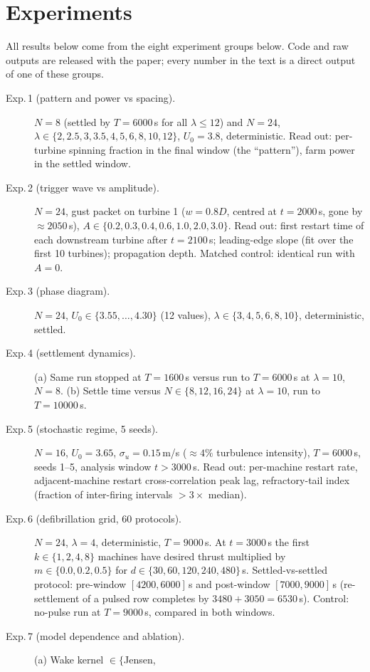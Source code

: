 \documentclass[11pt]{article}
\newcommand{\uU}{U_0}
\begin{document}
\section{Experiments}
\label{sec:experiments}

All results below come from the eight experiment groups below. Code and raw outputs are
released with the paper; every number in the text is a direct output of one of these groups.

\begin{description}
\item[Exp.\,1 (pattern and power vs spacing).] $N=8$ (settled by $T=6000$\,s for all
$\lambda\le 12$) and $N=24$, $\lambda\in\{2,2.5,3,3.5,4,5,6,8,10,12\}$, $\uU=3.8$,
deterministic. Read out: per-turbine spinning fraction in the final window (the ``pattern''),
farm power in the settled window.
\item[Exp.\,2 (trigger wave vs amplitude).] $N=24$, gust packet on turbine 1
($w=0.8D$, centred at $t=2000$\,s, gone by $\approx 2050$\,s), $A\in\{0.2,0.3,0.4,0.6,1.0,2.0,3.0\}$.
Read out: first restart time of each downstream turbine after $t=2100$\,s; leading-edge slope
(fit over the first 10 turbines); propagation depth. Matched control: identical run with
$A=0$.
\item[Exp.\,3 (phase diagram).] $N=24$, $\uU\in\{3.55,\dots,4.30\}$ (12 values),
$\lambda\in\{3,4,5,6,8,10\}$, deterministic, settled.
\item[Exp.\,4 (settlement dynamics).] (a) Same run stopped at $T=1600$\,s versus run to
$T=6000$\,s at $\lambda=10$, $N=8$. (b) Settle time versus $N\in\{8,12,16,24\}$ at
$\lambda=10$, run to $T=10000$\,s.
\item[Exp.\,5 (stochastic regime, 5 seeds).] $N=16$, $\uU=3.65$, $\sigma_u=0.15$\,m/s
($\approx 4\%$ turbulence intensity), $T=6000$\,s, seeds 1--5, analysis window $t>3000$\,s.
Read out: per-machine restart rate, adjacent-machine restart cross-correlation peak lag,
refractory-tail index (fraction of inter-firing intervals $>3\times$ median).
\item[Exp.\,6 (defibrillation grid, 60 protocols).] $N=24$, $\lambda=4$, deterministic,
$T=9000$\,s. At $t=3000$\,s the first $k\in\{1,2,4,8\}$ machines have desired thrust
multiplied by $m\in\{0.0,0.2,0.5\}$ for $d\in\{30,60,120,240,480\}$\,s. Settled-vs-settled
protocol: pre-window $[4200,6000]$\,s and post-window $[7000,9000]$\,s (re-settlement of a
pulsed row completes by $3480+3050=6530$\,s). Control: no-pulse run at $T=9000$\,s,
compared in both windows.
\item[Exp.\,7 (model dependence and ablation).] (a) Wake kernel $\in\{$Jensen,

\end{description}
\end{document}
